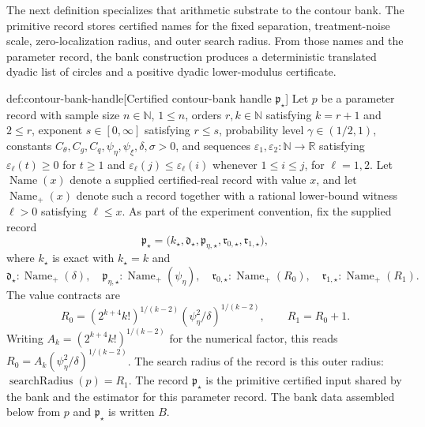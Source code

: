 The next definition specializes that arithmetic substrate to the contour bank. The primitive record stores certified names for the fixed separation, treatment-noise scale, zero-localization radius, and outer search radius. From those names and the parameter record, the bank construction produces a deterministic translated dyadic list of circles and a positive dyadic lower-modulus certificate.

\begin{definitionv}{def:contour-bank-handle}[Certified contour-bank handle $\mathfrak p_{\star}$]
Let \(p\) be a parameter record with sample size \(n\in\mathbb N\), \(1\le n\), orders \(r,k\in\mathbb N\) satisfying \(k=r+1\) and \(2\le r\), exponent \(s\in[0,\infty]\) satisfying \(r\le s\), probability level \(\gamma\in(1/2,1)\), constants \(C_{\theta},C_g,C_q,\psi_{\eta},\psi_{\xi},\delta,\sigma>0\), and sequences \(\varepsilon_1,\varepsilon_2:\mathbb N\to\mathbb R\) satisfying \(\varepsilon_\ell(t)\ge0\) for \(t\ge1\) and \(\varepsilon_\ell(j)\le\varepsilon_\ell(i)\) whenever \(1\le i\le j\), for \(\ell=1,2\). Let \(\operatorname{Name}(x)\) denote a supplied certified-real record with value \(x\), and let \(\operatorname{Name}_{+}(x)\) denote such a record together with a rational lower-bound witness \(\ell>0\) satisfying \(\ell\le x\). As part of the experiment convention, fix the supplied record
\[
 \mathfrak p_{\star}=
 \bigl(k_{\star},\mathfrak d_{\star},\mathfrak p_{\eta,\star},
       \mathfrak r_{0,\star},\mathfrak r_{1,\star}\bigr),
\]
where \(k_{\star}\) is exact with \(k_{\star}=k\) and
\[
 \mathfrak d_{\star}:\operatorname{Name}_{+}(\delta),\quad
 \mathfrak p_{\eta,\star}:\operatorname{Name}_{+}(\psi_{\eta}),\quad
 \mathfrak r_{0,\star}:\operatorname{Name}_{+}(R_0),\quad
 \mathfrak r_{1,\star}:\operatorname{Name}_{+}(R_1).
\]
The value contracts are
\[
 R_0=(2^{k+4}k!)^{1/(k-2)}
       (\psi_{\eta}^2/\delta)^{1/(k-2)},
 \qquad R_1=R_0+1.
\]
Writing \(A_k=(2^{k+4}k!)^{1/(k-2)}\) for the numerical factor, this reads \(R_0=A_k(\psi_{\eta}^2/\delta)^{1/(k-2)}\). The search radius of the record is this outer radius: \(\operatorname{searchRadius}(p)=R_1\).
The record \(\mathfrak p_{\star}\) is the primitive certified input shared by the bank and the estimator for this parameter record.  The bank data assembled below from \(p\) and \(\mathfrak p_{\star}\) is written \(B\).


\end{definitionv}
